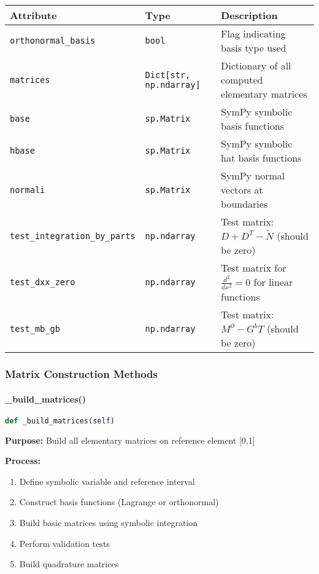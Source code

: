 \begin{longtable}{|p{5.5cm}|p{2.5cm}|p{6cm}|}
\hline
\textbf{Attribute} & \textbf{Type} & \textbf{Description} \\
\hline
\endhead

\texttt{orthonormal\_basis} & \texttt{bool} & Flag indicating basis type used \\
\hline

\texttt{matrices} & \texttt{Dict[str, np.ndarray]} & Dictionary of all computed elementary matrices \\
\hline

\texttt{base} & \texttt{sp.Matrix} & SymPy symbolic basis functions \\
\hline

\texttt{hbase} & \texttt{sp.Matrix} & SymPy symbolic hat basis functions \\
\hline

\texttt{normali} & \texttt{sp.Matrix} & SymPy normal vectors at boundaries \\
\hline

\texttt{test\_integration\_by\_parts} & \texttt{np.ndarray} & Test matrix: $D + D^T - \tilde{N}$ (should be zero) \\
\hline

\texttt{test\_dxx\_zero} & \texttt{np.ndarray} & Test matrix for $\frac{d^2}{dx^2} = 0$ for linear functions \\
\hline

\texttt{test\_mb\_gb} & \texttt{np.ndarray} & Test matrix: $M^{\partial} - G^b T$ (should be zero) \\
\hline

\end{longtable}

\subsubsection{Matrix Construction Methods}

\paragraph{\_build\_matrices()}\leavevmode
\begin{lstlisting}[language=Python, caption=Build Matrices Method]
def _build_matrices(self)
\end{lstlisting}

\textbf{Purpose:} Build all elementary matrices on reference element [0,1]

\textbf{Process:}
\begin{enumerate}
    \item Define symbolic variable and reference interval
    \item Construct basis functions (Lagrange or orthonormal)
    \item Build basic matrices using symbolic integration
    \item Perform validation tests
    \item Build quadrature matrices
\end{enumerate}

